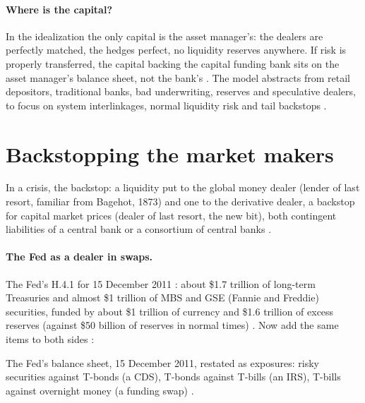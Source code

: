 \begin{paracol}{2}
\paragraph{Where is the capital?} In the idealization the only capital is the asset manager's: the dealers are perfectly matched, the hedges perfect, no liquidity
reserves anywhere. If risk is properly transferred, the capital backing the capital funding bank sits on the asset manager's balance sheet, not the bank's
. The model abstracts from retail depositors, traditional banks, bad underwriting, reserves and
speculative dealers, to focus on system interlinkages, normal liquidity risk and tail backstops .

\section{Backstopping the market makers}\label{sec:cbs-backstop}

In a crisis, the backstop: a liquidity put to the global money dealer (lender of last resort, familiar from Bagehot, 1873) and one to the derivative dealer, a
backstop for capital market prices (dealer of last resort, the new bit), both contingent liabilities of a central bank or a consortium of central banks
.

\paragraph{The Fed as a dealer in swaps.} The Fed's H.4.1 for 15 December 2011 : about \$1.7 trillion of long-term Treasuries and almost \$1 trillion of MBS and GSE
(Fannie and Freddie) securities, funded by about \$1 trillion of currency and \$1.6 trillion of excess reserves (against \$50 billion of reserves in normal times)
. Now add the same items to both sides :

\begin{nfigure}
\begin{taccts}
\end{taccts}
\caption{The Fed's balance sheet, 15 December 2011, restated as exposures: risky securities against T-bonds (a CDS), T-bonds against T-bills (an IRS), T-bills
against overnight money (a funding swap) .}\label{fig:cbs-fed}
\end{nfigure}


\end{paracol}
